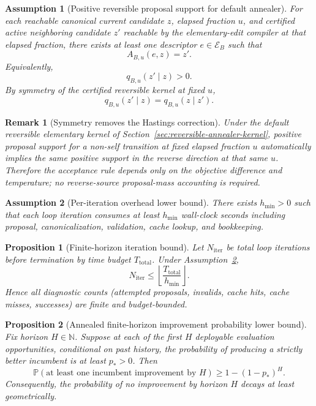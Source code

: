 \documentclass[11pt]{article}
\newtheorem{proposition}{Proposition}
\newtheorem{remark}{Remark}
\newtheorem{assumption}{Assumption}
\begin{document}
\begin{assumption}[Positive reversible proposal support for default annealer]\label{ass:positive-proposal-support}
For each reachable canonical current candidate $z$, elapsed fraction $u$, and
certified active neighboring candidate $z'$ reachable by the elementary-edit
compiler at that elapsed fraction, there exists at least one descriptor
$e\in\mathcal{E}_B$ such that
\[
A_{B,u}(e,z)=z'.
\]
Equivalently,
\[
q_{B,u}(z'\mid z)>0.
\]
By symmetry of the certified reversible kernel at fixed $u$,
\[
q_{B,u}(z'\mid z)=q_{B,u}(z\mid z').
\]
\end{assumption}

\begin{remark}[Symmetry removes the Hastings correction]
Under the default reversible elementary kernel of
Section~\ref{sec:reversible-annealer-kernel}, positive proposal support for a
non-self transition at fixed elapsed fraction $u$ automatically implies the
same positive support in the reverse direction at that same $u$. Therefore the
acceptance rule depends only on the objective difference and temperature; no
reverse-source proposal-mass accounting is required.
\end{remark}

\begin{assumption}[Per-iteration overhead lower bound]\label{ass:iter-overhead-lb}
There exists $h_{\min}>0$ such that each loop iteration consumes at least $h_{\min}$ wall-clock seconds including proposal, canonicalization, validation, cache lookup, and bookkeeping.
\end{assumption}

\begin{proposition}[Finite-horizon iteration bound]\label{prop:finite-iter-bound}
Let $N_{\mathrm{iter}}$ be total loop iterations before termination by time budget $T_{\mathrm{total}}$. Under Assumption~\ref{ass:iter-overhead-lb},
\[
N_{\mathrm{iter}}\le\left\lfloor\frac{T_{\mathrm{total}}}{h_{\min}}\right\rfloor.
\]
Hence all diagnostic counts (attempted proposals, invalids, cache hits, cache misses, successes) are finite and budget-bounded.
\end{proposition}

\begin{proposition}[Annealed finite-horizon improvement probability lower bound]\label{prop:finite-horizon-improve}
Fix horizon $H\in\mathbb{N}$. Suppose at each of the first $H$ deployable
evaluation opportunities, conditional on past history, the probability of
producing a strictly better incumbent is at least $p_*>0$. Then
\[
\mathbb{P}(\text{at least one incumbent improvement by }H)\ge 1-(1-p_*)^H.
\]
Consequently, the probability of no improvement by horizon $H$ decays at least geometrically.
\end{proposition}
\end{document}
